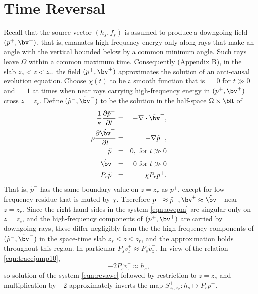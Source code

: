 \section{Time Reversal}

Recall that the source vector $(h_s,f_s)$ is assumed to produce a
downgoing field $(p^+,\bv^+)$, that is, emanates high-frequency energy only along
rays that make an angle with the vertical bounded below by a common
minimum angle. Such rays leave $\Omega$ within a common maximum
time. Consequently (Appendix B), in the
slab $z_s<z<z_r$, the field $(p^+,\bv^+)$ approximates the solution of an
anti-causal evolution equation. Choose $\chi(t)$ to be a smooth function
that is $= 0$ for $t \gg 0$ and $=1$ at times when near rays carrying
high-frequency energy in $(p^+,\bv^+)$ cross $z=z_r$. Define 
$(\tilde{p}^-,\tilde{\bv}^-)$ to be the solution in the half-space
$\Omega \times \bR$ of
\begin{eqnarray}
\label{eqn:revawe}
  \frac{1}{\kappa}\frac{\partial \tilde{p}^-}{\partial t} & = & - \nabla \cdot \tilde{\bv}^-, \nonumber \\
  \rho\frac{\partial \tilde{\bv}^-}{\partial t} & = & - \nabla \tilde{p}^-,\nonumber \\
  \tilde{p}^- & =& 0,  \mbox{ for } t \gg 0\\ 
  \tilde{\bv}^- & = & 0 \mbox{ for } t \gg 0\\
  P_r\tilde{p}^- &=& \chi P_rp^+ . 
\end{eqnarray}
That is, $\tilde{p}^-$ has the same boundary value on $z=z_r$ as
$p^+$, except for low-frequency residue that is muted by
$\chi$. Therefore
$p^+ \approx \tilde{p}^-, \bv^+ \approx \tilde{\bv}^-$ near
$z=z_r$. Since the right-hand sides in the system \ref{eqn:awepm} are
singular only on $z=z_s$, and the high-frequency components of
$(p^+,\bv^+)$ are carried by downgoing rays, these differ negligibly
from the the high-frequency components of
$(\tilde{p}^-,\tilde{\bv}^-)$ in the space-time slab $z_s<z<z_r$, and
the approximation holds throughout this region. In particular
$P_sv^+_z \approx P_s \tilde{v}^-_z$. In view of the relation
\ref{eqn:tracejump10},
\begin{equation}
  \label{eqn:tildevtohsubs}
  -2P_s\tilde{v}^-_z \approx h_s,
\end{equation}
so solution
of the system \ref{eqn:revawe} followed by restriction to $z=z_s$ and
multiplication by $-2$ 
approximately inverts the map $S^+_{z_s,z_r}: h_s \mapsto P_rp^+$.

